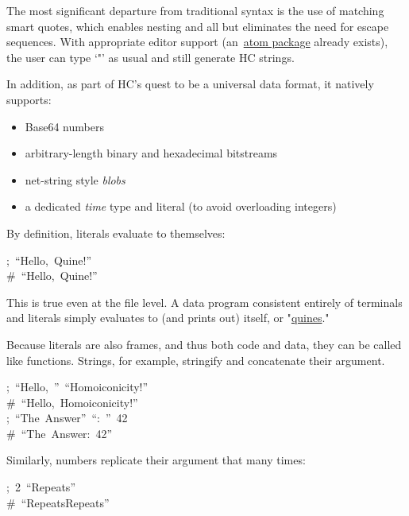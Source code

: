 \documentclass[preprint]{{sigplanconf}}
\begin{document}
The most significant departure from traditional syntax is the use of
matching smart quotes, which enables nesting and all but eliminates the
need for escape sequences. With appropriate editor support (an~\href{https://github.com/TheSwanFactory/language-maml}{atom
package} already exists),
the user can type \textquoteleft{}"\textquoteright{} as usual and still generate HC strings.%

In addition, as part of HC's quest to be a universal data format, it
natively supports:%

\begin{itemize}[noitemsep,topsep=\mdcompacttopsep]%

\item{}Base64 numbers%

\item{}arbitrary-length binary and hexadecimal bitstreams%

\item{}net-string style \emph{blobs}%

\item{}a dedicated \emph{time} type and literal (to avoid overloading integers)%
\end{itemize}%

\noindent{}By definition, literals evaluate to themselves:%
\begin{mdpre}%
\noindent;~“{Hello},~{Quine!}”\\
{\#~“Hello,~Quine!”}%
\end{mdpre}\noindent{}This is true even at the file level. A data program consistent entirely
of terminals and literals simply evaluates to (and prints out) itself, or
"\href{https://en.wikipedia.org/wiki/Quine_\%2528computing\%2529}{quines}."

Because literals are also frames, and thus both code and data, they can
be called like functions. Strings, for example, stringify and concatenate
their argument.%
\begin{mdpre}%
\noindent;~“{Hello},~”~“{Homoiconicity!}”\\
{\#~“Hello,~Homoiconicity!”}\\
;~“{The}~{Answer}”~“{:}~”~{42}\\
{\#~“The~Answer:~42”}%
\end{mdpre}\noindent{}Similarly, numbers replicate their argument that many times:
\begin{mdpre}%
\noindent;~2~“{Repeats}”\\
{\#~“RepeatsRepeats”}%
\end{mdpre}
\end{document}
